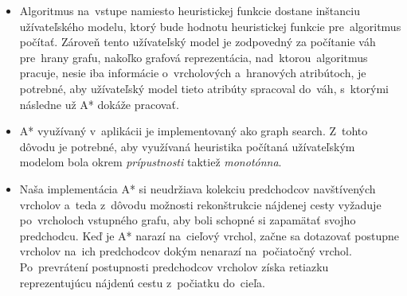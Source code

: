 \begin{itemize}
    \item Algoritmus na~vstupe namiesto heuristickej funkcie dostane inštanciu užívateľského modelu, ktorý bude hodnotu heuristickej funkcie pre~algoritmus počítať. Zároveň tento užívateľský model je zodpovedný za počítanie váh pre~hrany grafu, nakoľko grafová reprezentácia, nad~ktorou~algoritmus pracuje, nesie iba informácie o~vrcholových a~hranových atribútoch, je potrebné, aby užívateľský model tieto atribúty spracoval do~váh, s~ktorými následne už A* dokáže pracovať.   
    \item A* využívaný v~aplikácii je implementovaný ako graph search. Z~tohto dôvodu je potrebné, aby využívaná heuristika počítaná užívateľským modelom bola okrem \textit{prípustnosti} taktiež \textit{monotónna}.
    \item Naša implementácia A* si neudržiava kolekciu predchodcov navštívených vrcholov a~teda z~dôvodu možnosti rekonštrukcie nájdenej cesty vyžaduje po~vrcholoch vstupného grafu, aby boli schopné si zapamätať svojho predchodcu. Keď je A* narazí na~cieľový vrchol, začne sa dotazovať postupne vrcholov na~ich predchodcov dokým nenarazí na~počiatočný vrchol. Po~prevrátení postupnosti predchodcov vrcholov získa retiazku reprezentujúcu nájdenú cestu z~počiatku do~cieľa. 
\end{itemize}
